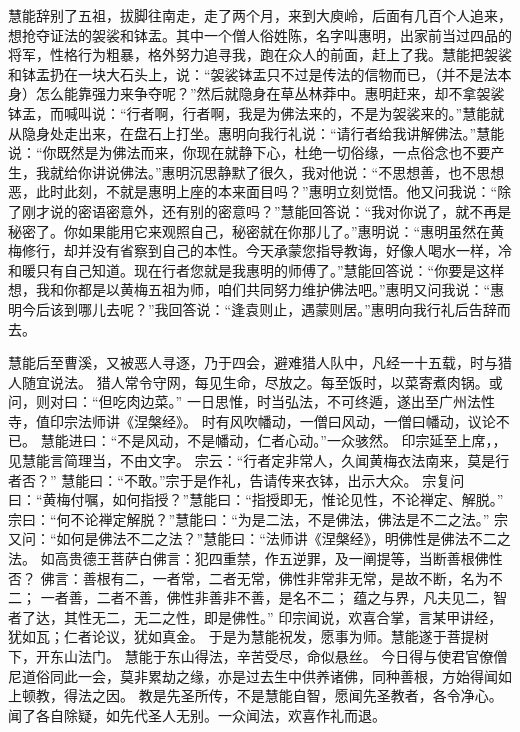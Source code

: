 \documentclass[12pt,twoside,openany]{book}
\newcommand{\kai}[1]{{\CJKfamily{kai}#1}}
\begin{document}
\kai{慧能辞别了五祖，拔脚往南走，走了两个月，来到大庾岭，后面有几百个人追来，想抢夺证法的袈裟和钵盂。其中一个僧人俗姓陈，名字叫惠明，出家前当过四品的将军，性格行为粗暴，格外努力追寻我，跑在众人的前面，赶上了我。慧能把袈裟和钵盂扔在一块大石头上，说：“袈裟钵盂只不过是传法的信物而已，（并不是法本身）怎么能靠强力来争夺呢？”然后就隐身在草丛林莽中。惠明赶来，却不拿袈裟钵盂，而喊叫说：“行者啊，行者啊，我是为佛法来的，不是为袈裟来的。”慧能就从隐身处走出来，在盘石上打坐。惠明向我行礼说：“请行者给我讲解佛法。”慧能说：“你既然是为佛法而来，你现在就静下心，杜绝一切俗缘，一点俗念也不要产生，我就给你讲说佛法。”惠明沉思静默了很久，我对他说：“不思想善，也不思想恶，此时此刻，不就是惠明上座的本来面目吗？”惠明立刻觉悟。他又问我说：“除了刚才说的密语密意外，还有别的密意吗？”慧能回答说：“我对你说了，就不再是秘密了。你如果能用它来观照自己，秘密就在你那儿了。”惠明说：“惠明虽然在黄梅修行，却并没有省察到自己的本性。今天承蒙您指导教诲，好像人喝水一样，冷和暖只有自己知道。现在行者您就是我惠明的师傅了。”慧能回答说：“你要是这样想，我和你都是以黄梅五祖为师，咱们共同努力维护佛法吧。”惠明又问我说：“惠明今后该到哪儿去呢？”我回答说：“逢袁则止，遇蒙则居。”惠明向我行礼后告辞而去。}

慧能后至曹溪，又被恶人寻逐，乃于四会，避难猎人队中，凡经一十五载，时与猎人随宜说法。
猎人常令守网，每见生命，尽放之。每至饭时，以菜寄煮肉锅。或问，则对曰：“但吃肉边菜。”
一日思惟，时当弘法，不可终遁，遂出至广州法性寺，值印宗法师讲《涅槃经》。
时有风吹幡动，一僧曰风动，一僧曰幡动，议论不已。
慧能进曰：“不是风动，不是幡动，仁者心动。”一众骇然。
印宗延至上席，，见慧能言简理当，不由文字。
宗云：“行者定非常人，久闻黄梅衣法南来，莫是行者否？”
慧能曰：“不敢。”宗于是作礼，告请传来衣钵，出示大众。
宗复问曰：“黄梅付嘱，如何指授？”慧能曰：“指授即无，惟论见性，不论禅定、解脱。”
宗曰：“何不论禅定解脱？”慧能曰：“为是二法，不是佛法，佛法是不二之法。”
宗又问：“如何是佛法不二之法？”慧能曰：“法师讲《涅槃经》，明佛性是佛法不二之法。
如高贵德王菩萨白佛言：犯四重禁，作五逆罪，及一阐提等，当断善根佛性否？
佛言：善根有二，一者常，二者无常，佛性非常非无常，是故不断，名为不二；
一者善，二者不善，佛性非善非不善，是名不二；
蕴之与界，凡夫见二，智者了达，其性无二，无二之性，即是佛性。”
印宗闻说，欢喜合掌，言某甲讲经，犹如瓦；仁者论议，犹如真金。
于是为慧能祝发，愿事为师。慧能遂于菩提树下，开东山法门。
慧能于东山得法，辛苦受尽，命似悬丝。
今日得与使君官僚僧尼道俗同此一会，莫非累劫之缘，亦是过去生中供养诸佛，同种善根，方始得闻如上顿教，得法之因。
教是先圣所传，不是慧能自智，愿闻先圣教者，各令净心。闻了各自除疑，如先代圣人无别。一众闻法，欢喜作礼而退。
\end{document}
